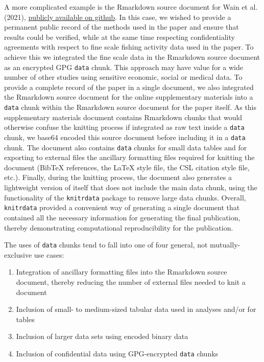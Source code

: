 A more complicated example is the Rmarkdown source document for Wain et al. (2021), \href{https://github.com/dmkaplan2000/knitrdata_examples/blob/e5f59b7475a542bef41c60e8ee6652f656c9e377/wain.et.al.2020.standalone.Rmd}{publicly available on github}. In this case, we wished to provide a permanent public record of the methods used in the paper and ensure that results could be verified, while at the same time respecting confidentiality agreements with respect to fine scale fishing activity data used in the paper. To achieve this we integrated the fine scale data in the Rmarkdown source document as an encrypted GPG \texttt{data} chunk. This approach may have value for a wide number of other studies using sensitive economic, social or medical data. To provide a complete record of the paper in a single document, we also integrated the Rmarkdown source document for the online supplementary materials into a \texttt{data} chunk within the Rmarkdown source document for the paper itself. As this supplementary materials document contains Rmarkdown chunks that would otherwise confuse the knitting process if integrated as raw text inside a \texttt{data} chunk, we base64 encoded this source document before including it in a \texttt{data} chunk. The document also contains \texttt{data} chunks for small data tables and for exporting to external files the ancillary formatting files required for knitting the document (BibTeX references, the LaTeX style file, the CSL citation style file, etc.). Finally, during the knitting process, the document also generates a lightweight version of itself that does not include the main data chunk, using the functionality of the \texttt{knitrdata} package to remove large data chunks. Overall, \texttt{knitrdata} provided a convenient way of generating a single document that contained all the necessary information for generating the final publication, thereby demonstrating computational reproducibility for the publication.

The uses of \texttt{data} chunks tend to fall into one of four general, not mutually-exclusive use cases:

\begin{enumerate}
\def\labelenumi{\arabic{enumi})}
\tightlist
\item
  Integration of ancillary formatting files into the Rmarkdown source document, thereby reducing the number of external files needed to knit a document
\item
  Inclusion of small- to medium-sized tabular data used in analyses and/or for tables
\item
  Inclusion of larger data sets using encoded binary data
\item
  Inclusion of confidential data using GPG-encrypted \texttt{data} chunks
\end{enumerate}

